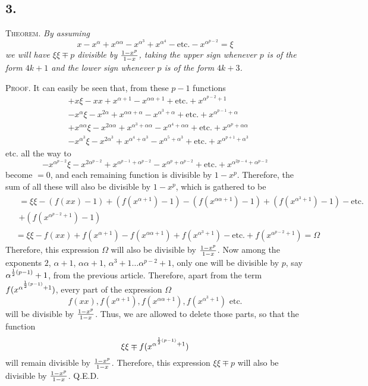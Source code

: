\documentclass[twoside,12pt, showframe]{memoir}
\let\oldfrac\frac
\def\frac#1#2{\mathchoice{\tfrac{#1}{#2}}{\oldfrac{#1}{#2}}{\genfrac{}{}{}{2}{#1}{#2\mathstrut}}{\genfrac{}{}{}{3}{#1}{#2\mathstrut}}}
\begin{document}
\subsection*{3.}

\textsc{Theorem.} \textit{By assuming}
\[x-x^{\alpha}+x^{\alpha \alpha}-x^{\alpha^{3}}+x^{\alpha^{4}}-\text{etc.}-x^{\alpha^{p-2}}=\xi\]
\textit{we will have \(\xi \xi \mp p\) divisible by \(\frac{1-x^{p}}{1- x}\), taking the upper sign whenever \(p\) is of the form \(4k+1\) and the lower sign whenever \(p\) is of the form \(4k+3\).}

\textsc{Proof.} It can easily be seen that, from these \(p-1\) functions
\[\begin{aligned}
& +x \xi-x x+x^{\alpha+1}-x^{\alpha \alpha+1}+\text{etc.}+x^{\alpha^{p-2}+1} \\
& -x^{\alpha} \xi-x^{2 \alpha}+x^{\alpha \alpha+\alpha}-x^{\alpha^{3}+\alpha}+\text{etc.}+x^{\alpha^{p-1}+\alpha} \\
& +x^{\alpha \alpha} \xi-x^{2 \alpha \alpha}+x^{\alpha^{3}+\alpha \alpha}-x^{\alpha^{4}+\alpha \alpha}+\text{etc.}+x^{\alpha^{p}+\alpha \alpha} \\
& -x^{\alpha^{3}} \xi-x^{2 \alpha^{3}}+x^{\alpha^{4}+\alpha^{3}}-x^{\alpha^{5}+\alpha^{3}}+\text{etc.}+x^{\alpha^{p+1}+\alpha^{3}}
\end{aligned}\]
etc. all the way to
\[-x^{\alpha^{p-2}} \xi-x^{2 \alpha^{p-2}}+x^{\alpha^{p-1}+\alpha^{p-2}}-x^{\alpha^{p}+\alpha^{p-2}}+\text{etc.}+x^{\alpha^{2 p-4}+\alpha^{p-2}}\]
become \(=0\), and each remaining function is divisible by \(1-x^{p}\). Therefore, the sum of all these will also be divisible by \(1-x^{p}\), which is gathered to be
\[\begin{aligned}
&\begin{gathered}=\xi \xi-(f(x x)-1)+(f(x^{\alpha+1})-1)-(f(x^{\alpha \alpha+1})-1)+(f(x^{\alpha^{3}+1})-1)-\text{etc.}\\
+(f(x^{\alpha^{p-2}+1})-1) \end{gathered}\\
&=\xi \xi-f(x x)+f(x^{\alpha+1})-f(x^{\alpha \alpha+1})+f(x^{\alpha^{3}+1})-\text{etc.}+f(x^{\alpha^{p-2}+1})=\Omega
\end{aligned}\]
Therefore, this expression \(\Omega\) will also be divisible by \(\frac{1-x^{p}}{1-x}\). Now among the exponents \(2\), \(\alpha+1\), \(\alpha \alpha+1\), \(\alpha^{3}+1 \ldots \alpha^{p-2}+1\), only one will be divisible by \(p\), say \(\alpha^{\frac{1}{2}(p-1)}+1\), from the previous article. Therefore, apart from the term \(f(x^{\alpha^{\frac{1}{2}(p-1)}+1})\), every part of the expression \(\Omega\)
\[f(x x), f(x^{\alpha+1}), f(x^{\alpha \alpha+1}), f(x^{\alpha^{3}+1}) \text{ etc.}\]
will be divisible by \(\frac{1-x^{p}}{1-x}\). Thus, we are allowed to delete those parts, so that the function
\[\xi \xi \mp f(x^{\alpha^{\frac{1}{2}(p-1)}+1})\]
will remain divisible by \(\frac{1-x^{p}}{1-x}\). Therefore, this expression \(\xi \xi \mp p\) will also be divisible by \(\frac{1-x^{p}}{1-x}\). Q.E.D.
\end{document}
